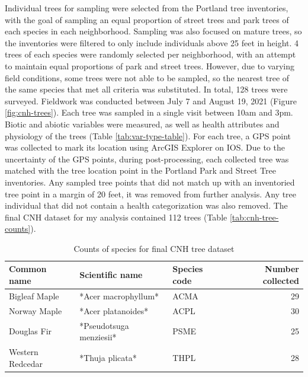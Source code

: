 \documentclass[12pt,twoside]{reedthesis}
\begin{document}
Individual trees for sampling were selected from the Portland tree
inventories, with the goal of sampling an equal proportion of street
trees and park trees of each species in each neighborhood. Sampling was
also focused on mature trees, so the inventories were filtered to only
include individuals above 25 feet in height. 4 trees of each species
were randomly selected per neighborhood, with an attempt to maintain
equal proportions of park and street trees. However, due to varying
field conditions, some trees were not able to be sampled, so the nearest
tree of the same species that met all criteria was substituted. In
total, 128 trees were surveyed. Fieldwork was conducted between July 7
and August 19, 2021 (Figure \ref{fig:cnh-trees}). Each tree was sampled
in a single visit between 10am and 3pm. Biotic and abiotic variables
were measured, as well as health attributes and physiology of the trees
(Table \ref{tab:var-type-table}). For each tree, a GPS point was
collected to mark its location using ArcGIS Explorer on IOS. Due to the
uncertainty of the GPS points, during post-processing, each collected
tree was matched with the tree location point in the Portland Park and
Street Tree inventories. Any sampled tree points that did not match up
with an inventoried tree point in a margin of 20 feet, it was removed
from further analysis. Any tree individual that did not contain a health
categorization was also removed. The final CNH dataset for my analysis
contained 112 trees (Table \ref{tab:cnh-tree-counts}).
\begin{table}

\caption[Final CNH Tree counts]{\label{tab:unnamed-chunk-1}Counts of species for final CNH tree dataset}
\centering
\begin{tabular}[t]{lllr}
\toprule
Common name & Scientific name & Species code & Number collected\\
\midrule
Bigleaf Maple & *Acer macrophyllum* & ACMA & 29\\
Norway Maple & *Acer platanoides* & ACPL & 30\\
Douglas Fir & *Pseudotsuga menziesii* & PSME & 25\\
Western Redcedar & *Thuja plicata* & THPL & 28\\
\bottomrule
\end{tabular}
\end{table}
\end{document}
